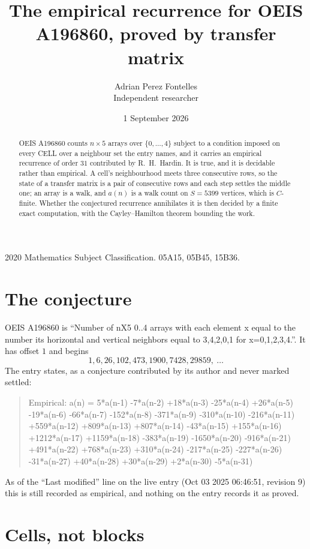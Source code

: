 \documentclass[11pt,a4paper]{article}
\title{The empirical recurrence for OEIS A196860, proved by transfer matrix}
\author{Adrian Perez Fontelles\\ \small Independent researcher}
\date{1 September 2026}
\theoremstyle{plain}
\theoremstyle{definition}
\begin{document}
\maketitle

\begin{abstract}
OEIS A196860 counts $n\times5$ arrays over $\{0,\dots,4\}$ subject to a condition imposed on
every CELL over a neighbour set the entry names, and it carries an empirical recurrence of
order $31$ contributed by R.~H.~Hardin. It is true, and it is decidable rather than
empirical. A cell's neighbourhood meets three consecutive rows, so the state of a transfer
matrix is a pair of consecutive rows and each step settles the middle one; an array is a
walk, and $a(n)$ is a walk count on $S=5399$ vertices, which is $C$-finite. Whether the
conjectured recurrence annihilates it is then decided by a finite exact computation, with the
Cayley--Hamilton theorem bounding the work.
\end{abstract}

\noindent\small 2020 Mathematics Subject Classification. 05A15, 05B45, 15B36.\normalsize

\section{The conjecture}

OEIS A196860 is ``Number of nX5 0..4 arrays with each element x equal to the number its horizontal and vertical neighbors equal to 3,4,2,0,1 for x=0,1,2,3,4.''. It has offset $1$ and begins
\[
1, 6, 26, 102, 473, 1900, 7428, 29859,\ \dots
\]
The entry states, as a conjecture contributed by its author and never marked settled:
\begin{quote}
Empirical: a(n) = 5*a(n-1) -7*a(n-2) +18*a(n-3) -25*a(n-4) +26*a(n-5) -19*a(n-6) -66*a(n-7) -152*a(n-8) -371*a(n-9) -310*a(n-10) -216*a(n-11) +559*a(n-12) +809*a(n-13) +807*a(n-14) -43*a(n-15) +155*a(n-16) +1212*a(n-17) +1159*a(n-18) -383*a(n-19) -1650*a(n-20) -916*a(n-21) +491*a(n-22) +768*a(n-23) +310*a(n-24) -217*a(n-25) -227*a(n-26) -31*a(n-27) +40*a(n-28) +30*a(n-29) +2*a(n-30) -5*a(n-31)
\end{quote}
As of the ``Last modified'' line on the live entry (Oct 03 2025 06:46:51, revision 9) this is still
recorded as empirical, and nothing on the entry records it as proved.

\section{Cells, not blocks}
\end{document}
